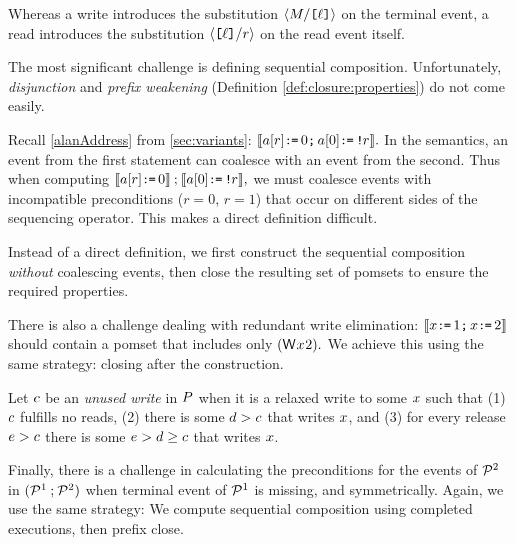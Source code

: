 Whereas a write introduces the substitution $\langle M/\texttt{[}\ell\texttt{]}\rangle$ on
the terminal event, a read introduces the substitution
$\langle\texttt{[}\ell\texttt{]}/r\rangle$ on the read event itself.

The most significant challenge is defining sequential composition.
Unfortunately, \emph{disjunction} and \emph{prefix weakening} (Definition
\ref{def:closure:properties}) do not come easily.

Recall \eqref{alanAddress} from \textsection\ref{sec:variants}:
\begin{math}
  \llbracket a[r] \texttt{:}\mkern-1mu\texttt{=}\, 0\texttt{;}\,\allowbreak a[0]\texttt{:}\mkern-1mu\texttt{=}\, \texttt{!}\mkern-1mu r\rrbracket.
\end{math}
In the semantics, an event from the first statement can coalesce with an
event from the second.  Thus when computing
\begin{math}
  \llbracket a[r] \texttt{:}\mkern-1mu\texttt{=}\, 0\rrbracket \mathbin; \llbracket a[0]\texttt{:}\mkern-1mu\texttt{=}\, \texttt{!}\mkern-1mu r\rrbracket,
\end{math}
we must coalesce events with incompatible preconditions ($r{=}0$, $r{=}1$)
that occur on different sides of the sequencing operator.  This makes a
direct definition difficult.

Instead of a direct definition, we first construct the sequential composition
\emph{without} coalescing events, then close the resulting set of pomsets to
ensure the required properties.

There is also a challenge dealing with redundant write elimination:
\begin{math}
  \llbracket x\texttt{:}\mkern-1mu\texttt{=}\, 1\texttt{;}\,\allowbreak x\texttt{:}\mkern-1mu\texttt{=}\, 2\rrbracket 
\end{math}
should contain a pomset that includes only
\begin{math}
  (\DW{x}{2}).
\end{math}
We achieve this using the same strategy: closing after the construction.

Let $c$ be an \emph{unused write} in $P$ when it is a relaxed write to
some $x$ such that (1) $c$ fulfills no reads, (2) there is some
$d>c$ that writes $x$, and (3) for every release $e>c$
there is some $e>d\ge c$ that writes $x$.

Finally, there is a challenge in calculating the preconditions for the events
of $\mathcal{P}^2$ in $(\mathcal{P}^1\mathbin;\mathcal{P}^2)$ when terminal event of $\mathcal{P}^1$ is
missing, and symmetrically.  Again, we use the same strategy: We compute
sequential composition using completed executions, then prefix close.

